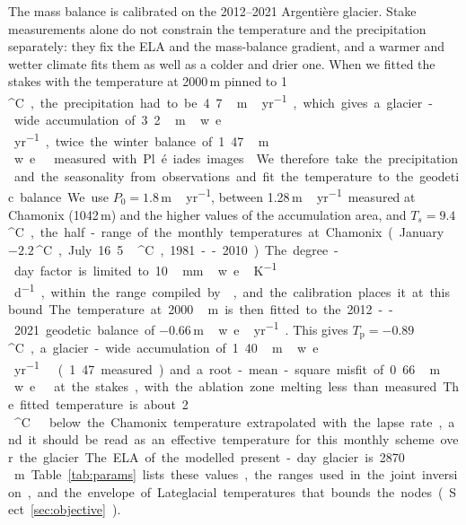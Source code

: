 \documentclass[tc, manuscript]{copernicus}
\newcommand{\degC}{\unit{^{\circ}C}}
\newcommand{\myr}{\unit{m\,yr^{-1}}}
\newcommand{\mwe}{\unit{m\,w.e.\,yr^{-1}}}
\newcommand{\ddfunit}{\unit{mm\,w.e.\,K^{-1}\,d^{-1}}}
\begin{document}
The mass balance is calibrated on the 2012--2021 Argenti\`ere glacier. Stake measurements alone do not constrain the temperature and the precipitation separately: they fix the ELA and the mass-balance gradient, and a warmer and wetter climate fits them as well as a colder and drier one. When we fitted the stakes with the temperature at 2000\,m pinned to 1\,\degC, the precipitation had to be 4.7\,\myr, which gives a glacier-wide accumulation of 3.2\,\unit{m\,w.e.\,yr^{-1}}, twice the winter balance of 1.47\,m\,w.e.\ measured with Pl\'eiades images \citep{beraud2023}. We therefore take the precipitation and the seasonality from observations and fit the temperature to the geodetic balance. We use $P_0=1.8$\,\myr, between 1.28\,\myr\ measured at Chamonix (1042\,m) and the higher values of the accumulation area, and $T_s=9.4$\,\degC, the half-range of the monthly temperatures at Chamonix (January $-2.2$\,\degC, July 16.5\,\degC, 1981--2010). The degree-day factor is limited to 10\,\ddfunit, within the range compiled by \citet{hock2003}, and the calibration places it at this bound. The temperature at 2000\,m is then fitted to the 2012--2021 geodetic balance of $-0.66$\,\mwe\ \citep{beraud2023}. This gives $T_\mathrm{p}=-0.89$\,\degC, a glacier-wide accumulation of 1.40\,\mwe\ (1.47 measured) and a root-mean-square misfit of 0.66\,m\,w.e.\ at the stakes, with the ablation zone melting less than measured. The fitted temperature is about 2\,\degC\ below the Chamonix temperature extrapolated with the lapse rate, and it should be read as an effective temperature for this monthly scheme over the glacier. The ELA of the modelled present-day glacier is 2870\,m. Table~\ref{tab:params} lists these values, the ranges used in the joint inversion, and the envelope of Lateglacial temperatures that bounds the nodes (Sect.~\ref{sec:objective}).
\end{document}
